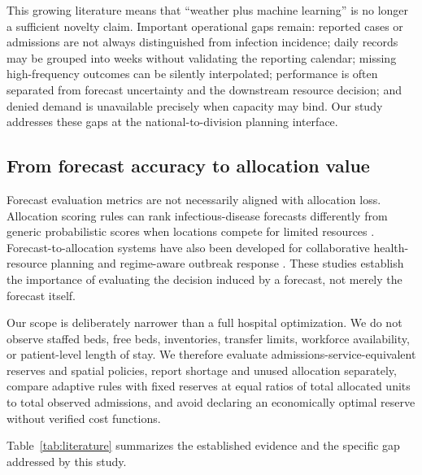 \documentclass[11pt]{article}
\begin{document}
This growing literature means that ``weather plus machine learning'' is no longer a sufficient novelty claim. Important operational gaps remain: reported cases or admissions are not always distinguished from infection incidence; daily records may be grouped into weeks without validating the reporting calendar; missing high-frequency outcomes can be silently interpolated; performance is often separated from forecast uncertainty and the downstream resource decision; and denied demand is unavailable precisely when capacity may bind. Our study addresses these gaps at the national-to-division planning interface.

\subsection{From forecast accuracy to allocation value}

Forecast evaluation metrics are not necessarily aligned with allocation loss. Allocation scoring rules can rank infectious-disease forecasts differently from generic probabilistic scores when locations compete for limited resources \citep{gerding2024}. Forecast-to-allocation systems have also been developed for collaborative health-resource planning and regime-aware outbreak response \citep{jiang2024,soto2026}. These studies establish the importance of evaluating the decision induced by a forecast, not merely the forecast itself.

Our scope is deliberately narrower than a full hospital optimization. We do not observe staffed beds, free beds, inventories, transfer limits, workforce availability, or patient-level length of stay. We therefore evaluate admissions-service-equivalent reserves and spatial policies, report shortage and unused allocation separately, compare adaptive rules with fixed reserves at equal ratios of total allocated units to total observed admissions, and avoid declaring an economically optimal reserve without verified cost functions.

Table~\ref{tab:literature} summarizes the established evidence and the specific gap addressed by this study.
\end{document}
